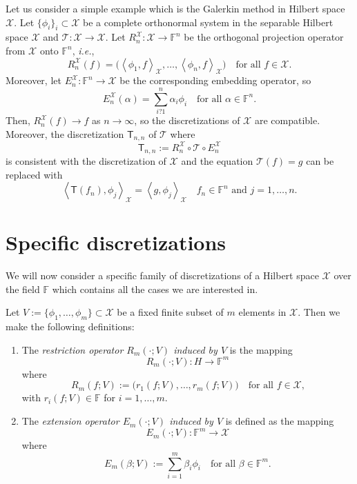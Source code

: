 \documentclass[a4paper]{paper}
\newcommand{\VecSpace}[1]{\mathscr{#1}}
\newcommand{\Field}{\mathbb{F}}
\newcommand{\Op}[1]{\mathcal{#1}}
\newcommand{\DiscOp}[1]{\mathsf{#1}}
\newcommand*{\EXT}[2]{\ensuremath{E_{#1}^{#2}}}
\newcommand*{\REST}[2]{\ensuremath{R_{#1}^{#2}}}
\newcommand*{\RnX}{\ensuremath{\REST{n}{\VecSpace{X}}}}
\newcommand*{\EnX}{\ensuremath{\EXT{n}{\VecSpace{X}}}}
\newcommand{\ip}[2]{\left \langle #1,#2 \right\rangle}
\newcommand{\ie}{\textsl{i.e.}\xspace}
\begin{document}
\begin{examp}
Let us consider a simple example which is the 
Galerkin method in Hilbert space $\VecSpace{X}$. Let $\{ \phi_{i} \}_{i}\subset \VecSpace{X}$ be a 
complete orthonormal system in the separable Hilbert space $\VecSpace{X}$ and 
$\Op{T} \colon \VecSpace{X} \to \VecSpace{X}$. 
Let $\RnX \colon \VecSpace{X} \to \Field^{n}$ be the orthogonal projection operator 
from $\VecSpace{X}$ onto $\Field^{n}$, \ie,
\[ \RnX(f)= \bigl( \ip{\phi_{1}}{f}_{\VecSpace{X}}, \ldots, \ip{\phi_{n}}{f}_{\VecSpace{X}} \bigr)
   \quad\text{for all $f\in \VecSpace{X}$.} \]
Moreover, let $\EnX\colon \Field^{n} \to \VecSpace{X}$ be the corresponding embedding operator, so
\[ \EnX(\alpha)= \sum_{i?1}^n \alpha_i \phi_{i}
   \quad\text{for all $\alpha\in \Field^{n}$.} \]
Then, $\RnX(f)\to f$ as $n\to \infty$, so the discretizations of $\VecSpace{X}$ are 
compatible. Moreover, the discretization $\DiscOp{T}_{n,n}$ of $\Op{T}$ where 
\[ \DiscOp{T}_{n,n}:=\RnX\circ \Op{T} \circ \EnX \]
is consistent with the discretization of $\VecSpace{X}$ and the equation
$\Op{T}(f)=g$ can be replaced with 
\[ \ip{\DiscOp{T}(f_{n})}{\phi_{j}}_{\VecSpace{X}}=\ip{g}{\phi_{j}}_{\VecSpace{X}}
   \quad\text{$f_{n}\in \Field^{n}$ and $j=1,\ldots,n$.} \]
\end{examp}

\section{Specific discretizations}
\label{sec:specific_discretizations}

We will now consider a specific family of discretizations of a Hilbert space $\VecSpace{X}$ over the 
field $\Field$ which contains all the cases we are interested in. 
\begin{definition}
  Let $V:=\{ \phi_{1},\ldots,\phi_{m} \}\subset \VecSpace{X}$ be a fixed finite subset of $m$ elements in $\VecSpace{X}$.
  Then we make the following definitions:
  \begin{enumerate}
  \item The \emph{restriction operator $R_{m}(\cdot;V)$ induced by $V$} is the  mapping  
    \[ R_{m}(\cdot;V) \colon H \to \Field^{m} \]
    where 
    \[ R_{m}(f;V):=\bigl( r_{1}(f;V),\ldots,r_{m}(f;V) \bigr) 
       \quad\text{for all $f\in \VecSpace{X}$,} \]
    with $r_{i}(f;V)\in \Field$ for $i=1,\ldots,m$.
  \item The \emph{extension operator $E_{m}(\cdot;V)$ induced by 
    $V$} is defined as the mapping  
    \[ E_{m}(\cdot;V) \colon \Field^{m} \to \VecSpace{X} \]
    where 
    \[ E_{m}(\beta;V):=  \sum_{i=1}^m \beta_i \phi_{i}
       \quad\text{for all $\beta\in \Field^{m}$.} \]      
  \end{enumerate}
\end{definition}
\end{document}

